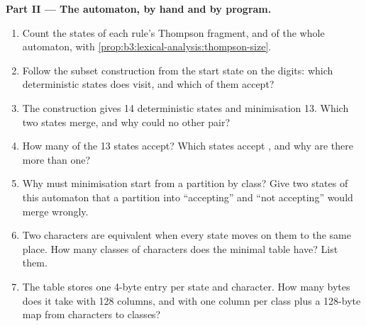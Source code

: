 \begin{problem}
\medskip\noindent\textbf{Part II --- The automaton, by hand and by program.}
\begin{enumerate}[resume]
\item Count the states of each rule's Thompson fragment, and of the whole automaton, with \cref{prop:b3:lexical-analysis:thompson-size}.
\item Follow the subset construction from the start state on the digits: which deterministic states does  visit, and which of them accept?
\item The construction gives 14 deterministic states and minimisation 13. Which two states merge, and why could no other pair?
\item How many of the 13 states accept? Which states accept , and why are there more than one?
\item Why must minimisation start from a partition by class? Give two states of this automaton that a partition into ``accepting'' and ``not accepting'' would merge wrongly.
\item Two characters are equivalent when every state moves on them to the same place. How many classes of characters does the minimal table have? List them.
\item The table stores one 4-byte entry per state and character. How many bytes does it take with 128 columns, and with one column per class plus a 128-byte map from characters to classes?
\end{enumerate}


\end{problem}
